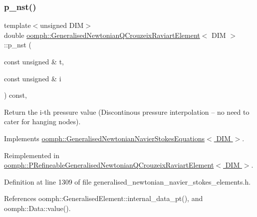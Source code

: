 \subsubsection{\texorpdfstring{p\+\_\+nst()}{p\_nst()}\hspace{0.1cm}{\footnotesize\ttfamily [2/2]}}
{\footnotesize\ttfamily template$<$unsigned D\+IM$>$ \\
double \hyperlink{classoomph_1_1GeneralisedNewtonianQCrouzeixRaviartElement}{oomph\+::\+Generalised\+Newtonian\+Q\+Crouzeix\+Raviart\+Element}$<$ D\+IM $>$\+::p\+\_\+nst (\begin{DoxyParamCaption}\item[{const unsigned \&}]{t,  }\item[{const unsigned \&}]{i }\end{DoxyParamCaption}) const\hspace{0.3cm}{\ttfamily [inline]}, {\ttfamily [virtual]}}



Return the i-\/th pressure value (Discontinous pressure interpolation -- no need to cater for hanging nodes). 



Implements \hyperlink{classoomph_1_1GeneralisedNewtonianNavierStokesEquations_a82eebde146ffb1b65a6c1ed8583c87f6}{oomph\+::\+Generalised\+Newtonian\+Navier\+Stokes\+Equations$<$ D\+I\+M $>$}.



Reimplemented in \hyperlink{classoomph_1_1PRefineableGeneralisedNewtonianQCrouzeixRaviartElement_a2c14443dfbea1eedbafd06caca166dd9}{oomph\+::\+P\+Refineable\+Generalised\+Newtonian\+Q\+Crouzeix\+Raviart\+Element$<$ D\+I\+M $>$}.



Definition at line 1309 of file generalised\+\_\+newtonian\+\_\+navier\+\_\+stokes\+\_\+elements.\+h.



References oomph\+::\+Generalised\+Element\+::internal\+\_\+data\+\_\+pt(), and oomph\+::\+Data\+::value().

\mbox{\label{classoomph_1_1GeneralisedNewtonianQCrouzeixRaviartElement_ac67f51cf0d592e011ea165f62ff8976e}} 

